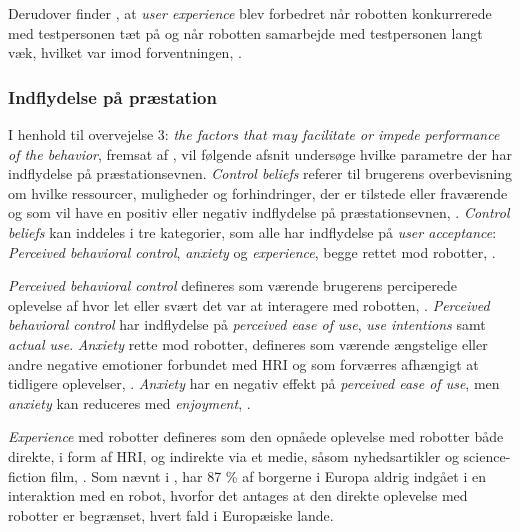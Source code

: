 Derudover finder \textcite[s. 785]{PDF:HowSocialDistanceShapesHRI}, at \textit{user experience} blev forbedret når robotten konkurrerede med testpersonen tæt på og når robotten samarbejde med testpersonen langt væk, hvilket var imod forventningen, \parencite[s. 785]{PDF:HowSocialDistanceShapesHRI}.   
%
\subsubsection*{Indflydelse på præstation}
\label{InteraktionSocialeRobotterParametrePraestation}
%
I henhold til overvejelse 3: \textit{the factors that may facilitate or impede performance of the behavior}, fremsat af \textcite[s. 1477]{PDF:SharingALifeHarvey}, vil følgende afsnit undersøge hvilke parametre der har indflydelse på præstationsevnen.\blankline
%
\textit{Control beliefs} referer til brugerens overbevisning om hvilke ressourcer, muligheder og forhindringer, der er tilstede eller fraværende og som vil have en positiv eller negativ indflydelse på præstationsevnen, \parencite[s. 1478]{PDF:ExploringInfluencingVariable}. \textit{Control beliefs} kan inddeles i tre kategorier, som alle har indflydelse på \textit{user acceptance}: \textit{Perceived behavioral control}, \textit{anxiety} og \textit{experience}, begge rettet mod robotter, \parencite[s. 1478]{PDF:ExploringInfluencingVariable}. 

\textit{Perceived behavioral control} defineres som værende brugerens perciperede oplevelse af hvor let eller svært det var at interagere med robotten, \parencite[s. 1478]{PDF:ExploringInfluencingVariable}. \textit{Perceived behavioral control} har indflydelse på \textit{perceived ease of use}, \textit{use intentions} samt \textit{actual use}. \textit{Anxiety} rette mod robotter, defineres som værende ængstelige eller andre negative emotioner forbundet med HRI og som forværres afhængigt at tidligere oplevelser, \parencite[s. 1478]{PDF:ExploringInfluencingVariable}. \textit{Anxiety} har en negativ effekt på \textit{perceived ease of use}, men \textit{anxiety} kan reduceres med \textit{enjoyment}, \parencite[s. 1478]{PDF:ExploringInfluencingVariable}. 

\textit{Experience} med robotter defineres som den opnåede oplevelse med robotter både direkte, i form af HRI, og indirekte via et medie, såsom nyhedsartikler og science-fiction film, \parencite[s. 1479]{PDF:ExploringInfluencingVariable}. Som nævnt i , har 87 \% af borgerne i Europa aldrig indgået i en interaktion med en robot, hvorfor det antages at den direkte oplevelse med robotter er begrænset, hvert fald i Europæiske lande.

